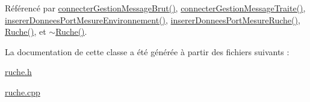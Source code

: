 Référencé par \hyperlink{class_ruche_a9c8e7e3b529676c6dda3d936370af00f}{connecter\+Gestion\+Message\+Brut()}, \hyperlink{class_ruche_a20ec8c6dc931218e5cf682050fe845d9}{connecter\+Gestion\+Message\+Traite()}, \hyperlink{class_ruche_a46c0f440f40a5125f2d579b481660457}{inserer\+Donnees\+Port\+Mesure\+Environnement()}, \hyperlink{class_ruche_aa61f6dd8b15e5242ef3a3bdd87cca4a3}{inserer\+Donnees\+Port\+Mesure\+Ruche()}, \hyperlink{class_ruche_a8b4ee3752d984c5acee93b990db7939a}{Ruche()}, et \hyperlink{class_ruche_ad3f950d0731f9801f06dd6ae09f2e5fa}{$\sim$\+Ruche()}.



La documentation de cette classe a été générée à partir des fichiers suivants \+:\begin{DoxyCompactItemize}
\item 
\hyperlink{ruche_8h}{ruche.\+h}\item 
\hyperlink{ruche_8cpp}{ruche.\+cpp}\end{DoxyCompactItemize}
